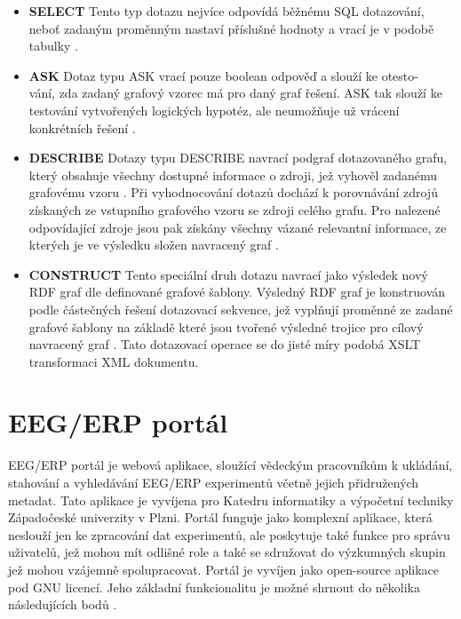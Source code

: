 \documentclass{projekt}
\begin{document}
\begin {itemize}

\item \textbf{SELECT} Tento typ dotazu nejvíce odpovídá běžnému SQL dotazování, neboť zadaným proměnným nastaví příslušné hodnoty a vrací je v podobě tabulky \cite{_14}.
\item \textbf{ASK} Dotaz typu ASK vrací pouze boolean odpověď a slouží ke otesto-\\vání, zda zadaný grafový vzorec má pro daný graf řešení. ASK tak slouží ke testování vytvořených logických hypotéz, ale neumožňuje už vrácení konkrétních řešení \cite{_13}.
\item \textbf{DESCRIBE} Dotazy typu DESCRIBE navrací podgraf dotazovaného grafu, který obsahuje všechny dostupné informace o zdroji, jež vyhověl zadanému grafovému vzoru \cite{_13}. Při vyhodnocování dotazů dochází k porovnávání zdrojů získaných ze vstupního grafového vzoru se zdroji celého grafu. Pro nalezené odpovídající zdroje jsou pak získány všechny vázané relevantní informace, ze kterých je ve výsledku složen navracený graf \cite{_14}.
\item \textbf{CONSTRUCT} Tento speciální druh dotazu navrací jako výsledek nový RDF graf dle definované grafové šablony. Výsledný RDF graf je konstruován podle částečných řešení dotazovací sekvence, jež vyplňují proměnné ze zadané grafové šablony na základě které jsou tvořené výsledné trojice pro cílový navracený graf \cite{_13}. Tato dotazovací operace se do jisté míry podobá XSLT transformaci XML dokumentu.

\end {itemize}

\chapter{EEG/ERP portál}
\hspace{0.65cm}EEG/ERP portál je webová aplikace, sloužící vědeckým pracovníkům k ukládání, stahování a vyhledávání EEG/ERP experimentů včetně jejich přidružených metadat. Tato aplikace je vyvíjena pro Katedru informatiky a výpočetní techniky Západočeské univerzity v Plzni. Portál funguje jako komplexní aplikace, která neslouží jen ke zpracování dat experimentů, ale poskytuje také funkce pro správu uživatelů, jež mohou mít odlišné role a také se sdružovat do výzkumných skupin jež mohou vzájemně spolupracovat. Portál je vyvíjen jako open-source aplikace pod GNU licencí. Jeho základní funkcionalitu je možné shrnout do několika následujících bodů \cite{_15}.
\end{document}
